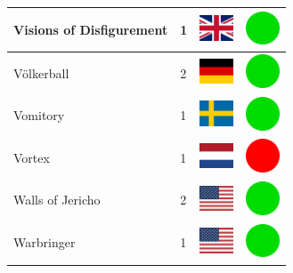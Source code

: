 \documentclass[12pt, a4paper, twoside]{report}
\begin{document}
\begin{center}
\begin{longtable}{|p{5cm}|p{2cm}|p{2cm}|p{2cm}|}
			Visions of Disfigurement & 1 & \includegraphics[width=1cm]{4x3/gb} & \includegraphics[width=1cm]{likes/y} \\ \hline
			Völkerball & 2 & \includegraphics[width=1cm]{4x3/de} & \includegraphics[width=1cm]{likes/y} \\ \hline
			Vomitory & 1 & \includegraphics[width=1cm]{4x3/se} & \includegraphics[width=1cm]{likes/y} \\ \hline
			Vortex & 1 & \includegraphics[width=1cm]{4x3/nl} & \includegraphics[width=1cm]{likes/n} \\ \hline
			Walls of Jericho & 2 & \includegraphics[width=1cm]{4x3/us} & \includegraphics[width=1cm]{likes/y} \\ \hline
			Warbringer & 1 & \includegraphics[width=1cm]{4x3/us} & \includegraphics[width=1cm]{likes/y} \\ \hline

\end{longtable}
\end{center}
\end{document}
